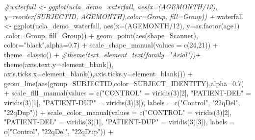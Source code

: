 \documentclass[
]{article}
\newenvironment{Shaded}{\begin{snugshade}}{\end{snugshade}}
\newcommand{\AttributeTok}[1]{\textcolor[rgb]{0.77,0.63,0.00}{#1}}
\newcommand{\CommentTok}[1]{\textcolor[rgb]{0.56,0.35,0.01}{\textit{#1}}}
\newcommand{\DecValTok}[1]{\textcolor[rgb]{0.00,0.00,0.81}{#1}}
\newcommand{\FloatTok}[1]{\textcolor[rgb]{0.00,0.00,0.81}{#1}}
\newcommand{\FunctionTok}[1]{\textcolor[rgb]{0.00,0.00,0.00}{#1}}
\newcommand{\NormalTok}[1]{#1}
\newcommand{\OtherTok}[1]{\textcolor[rgb]{0.56,0.35,0.01}{#1}}
\newcommand{\SpecialCharTok}[1]{\textcolor[rgb]{0.00,0.00,0.00}{#1}}
\newcommand{\StringTok}[1]{\textcolor[rgb]{0.31,0.60,0.02}{#1}}
\begin{document}
\begin{Shaded}
\begin{Highlighting}[]
\CommentTok{\#waterfall \textless{}{-} ggplot(ucla\_demo\_waterfall, aes(x=(AGEMONTH/12), y=reorder(SUBJECTID, AGEMONTH),color=Group, fill=Group)) +}
\NormalTok{waterfall }\OtherTok{\textless{}{-}} \FunctionTok{ggplot}\NormalTok{(ucla\_demo\_waterfall, }\FunctionTok{aes}\NormalTok{(}\AttributeTok{x=}\NormalTok{(AGEMONTH}\SpecialCharTok{/}\DecValTok{12}\NormalTok{), }\AttributeTok{y=}\FunctionTok{as.factor}\NormalTok{(age1) ,}\AttributeTok{color=}\NormalTok{Group, }\AttributeTok{fill=}\NormalTok{Group)) }\SpecialCharTok{+}
  \FunctionTok{geom\_point}\NormalTok{(}\FunctionTok{aes}\NormalTok{(}\AttributeTok{shape=}\NormalTok{Scanner), }\AttributeTok{color=}\StringTok{"black"}\NormalTok{,}\AttributeTok{alpha=}\FloatTok{0.7}\NormalTok{) }\SpecialCharTok{+} 
  \FunctionTok{scale\_shape\_manual}\NormalTok{(}\AttributeTok{values =} \FunctionTok{c}\NormalTok{(}\DecValTok{24}\NormalTok{,}\DecValTok{21}\NormalTok{)) }\SpecialCharTok{+} 
  \FunctionTok{theme\_classic}\NormalTok{() }\SpecialCharTok{+} 
  \CommentTok{\#theme(text=element\_text(family="Arial"))+}
  \FunctionTok{theme}\NormalTok{(}\AttributeTok{axis.text.y=}\FunctionTok{element\_blank}\NormalTok{(), }\AttributeTok{axis.ticks.x=}\FunctionTok{element\_blank}\NormalTok{(),}\AttributeTok{axis.ticks.y=}\FunctionTok{element\_blank}\NormalTok{()) }\SpecialCharTok{+} 
  \FunctionTok{geom\_line}\NormalTok{(}\FunctionTok{aes}\NormalTok{(}\AttributeTok{group=}\NormalTok{SUBJECTID,}\AttributeTok{color=}\NormalTok{SUBJECT\_IDENTITY),}\AttributeTok{alpha=}\FloatTok{0.7}\NormalTok{) }\SpecialCharTok{+}
  \FunctionTok{scale\_fill\_manual}\NormalTok{(}\AttributeTok{values =} \FunctionTok{c}\NormalTok{(}\StringTok{"CONTROL"} \OtherTok{=} \FunctionTok{viridis}\NormalTok{(}\DecValTok{3}\NormalTok{)[}\DecValTok{2}\NormalTok{], }\StringTok{"PATIENT{-}DEL"} \OtherTok{=} \FunctionTok{viridis}\NormalTok{(}\DecValTok{3}\NormalTok{)[}\DecValTok{1}\NormalTok{], }\StringTok{"PATIENT{-}DUP"} \OtherTok{=} \FunctionTok{viridis}\NormalTok{(}\DecValTok{3}\NormalTok{)[}\DecValTok{3}\NormalTok{]), }\AttributeTok{labels =} \FunctionTok{c}\NormalTok{(}\StringTok{"Control"}\NormalTok{, }\StringTok{"22qDel"}\NormalTok{, }\StringTok{"22qDup"}\NormalTok{)) }\SpecialCharTok{+}
  \FunctionTok{scale\_color\_manual}\NormalTok{(}\AttributeTok{values =} \FunctionTok{c}\NormalTok{(}\StringTok{"CONTROL"} \OtherTok{=} \FunctionTok{viridis}\NormalTok{(}\DecValTok{3}\NormalTok{)[}\DecValTok{2}\NormalTok{], }\StringTok{"PATIENT{-}DEL"} \OtherTok{=} \FunctionTok{viridis}\NormalTok{(}\DecValTok{3}\NormalTok{)[}\DecValTok{1}\NormalTok{], }\StringTok{"PATIENT{-}DUP"} \OtherTok{=} \FunctionTok{viridis}\NormalTok{(}\DecValTok{3}\NormalTok{)[}\DecValTok{3}\NormalTok{]), }\AttributeTok{labels =} \FunctionTok{c}\NormalTok{(}\StringTok{"Control"}\NormalTok{, }\StringTok{"22qDel"}\NormalTok{, }\StringTok{"22qDup"}\NormalTok{)) }\SpecialCharTok{+}

\end{Highlighting}
\end{Shaded}
\end{document}

